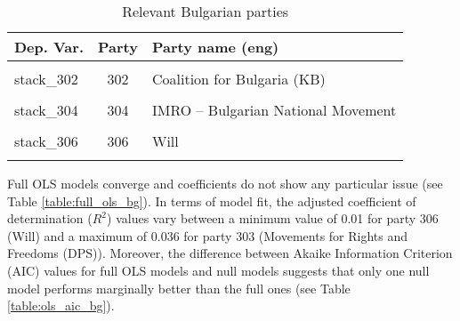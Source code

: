 \documentclass[
]{article}
\begin{document}
\begin{table}[!h]

\caption{\label{tab:unnamed-chunk-17}Relevant Bulgarian parties \label{table:relprty_tab_bg}}
\centering
\begin{tabular}[t]{lcl}
\toprule
Dep. Var. & Party & Party name (eng)\\
\midrule
\cellcolor{gray!6}{stack\_301} & \cellcolor{gray!6}{301} & \cellcolor{gray!6}{Citzizens for European Development of Bulgaria (GERB)}\\
stack\_302 & 302 & Coalition for Bulgaria (KB)\\
\cellcolor{gray!6}{stack\_303} & \cellcolor{gray!6}{303} & \cellcolor{gray!6}{Movements for Rights and Freedoms (DPS)}\\
stack\_304 & 304 & IMRO – Bulgarian National Movement\\
\cellcolor{gray!6}{stack\_305} & \cellcolor{gray!6}{305} & \cellcolor{gray!6}{Democratic Bulgaria}\\
\addlinespace
stack\_306 & 306 & Will\\
\cellcolor{gray!6}{stack\_307} & \cellcolor{gray!6}{307} & \cellcolor{gray!6}{National Union Attack (ATAKA/ATA)}\\
\bottomrule
\end{tabular}
\end{table}

Full OLS models converge and coefficients do not show any particular issue (see Table
\ref{table:full_ols_bg}).
In terms of model fit, the adjusted coefficient of determination (\(R^2\)) values vary between
a minimum value of 0.01
for party 306
(Will)
and a maximum of 0.036
for party 303
(Movements for Rights and Freedoms (DPS)).
Moreover, the difference between Akaike Information Criterion (AIC) values for full OLS models and null
models suggests that only one null model performs marginally better than the full ones (see Table
\ref{table:ols_aic_bg}).
\end{document}
